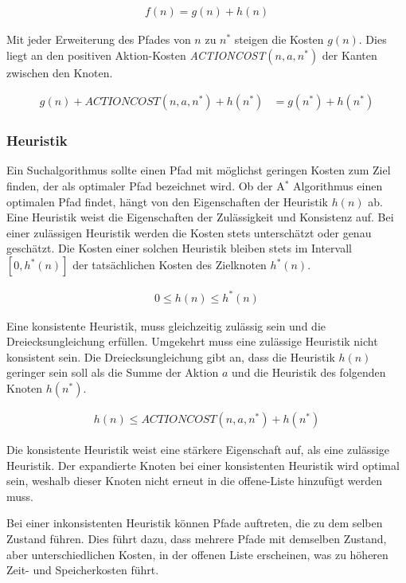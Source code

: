 \begin{align}
	f(n) = g(n) + h(n)
\end{align}


Mit jeder Erweiterung des Pfades von $n$ zu $n^{\ast}$ steigen die Kosten $g(n)$. Dies liegt an den positiven Aktion-Kosten \textit{ACTIONCOST}$(n,a,n^*)$ der Kanten zwischen den Knoten.


\begin{align}
	g(n) + \textit{ACTIONCOST}(n,a,n^*) + h(n^*) &= g(n^*) + h(n^*)
\end{align}

\subsubsection{Heuristik}

Ein Suchalgorithmus sollte einen Pfad mit m\"{o}glichst geringen Kosten zum Ziel finden, der als optimaler Pfad bezeichnet wird. Ob der A$^*$ Algorithmus einen optimalen Pfad findet, h\"{a}ngt von den Eigenschaften der Heuristik $h(n)$ ab. Eine Heuristik weist die Eigenschaften der Zul\"{a}ssigkeit und Konsistenz auf. Bei einer zul\"{a}ssigen Heuristik werden die Kosten stets untersch\"{a}tzt oder genau gesch\"{a}tzt. Die Kosten einer solchen Heuristik bleiben stets im Intervall $[0, h^{\ast}(n)]$ der tats\"{a}chlichen Kosten des Zielknoten $h^{\ast}(n)$.

\begin{align}
			0 \leq h(n) \leq h^*(n)
\end{align}

Eine konsistente Heuristik, muss gleichzeitig zul\"{a}ssig sein und die Dreiecksungleichung erf\"{u}llen. Umgekehrt muss eine zul\"{a}ssige Heuristik nicht konsistent sein. Die Dreiecksungleichung gibt an, dass die Heuristik $h(n)$ geringer sein soll als die Summe der Aktion $a$ und die Heuristik des folgenden Knoten $h(n^*)$.


\begin{align}
	h(n) \leq \textit{ACTIONCOST}(n,a,n^*) + h(n^*)
\end{align}

Die konsistente Heuristik weist eine st\"{a}rkere Eigenschaft auf, als eine zul\"{a}ssige Heuristik. Der expandierte Knoten bei einer konsistenten Heuristik wird optimal sein, weshalb dieser Knoten nicht erneut in die offene-Liste hinzuf\"{u}gt werden muss.

Bei einer inkonsistenten Heuristik k\"{o}nnen Pfade auftreten, die zu dem selben Zustand f\"{u}hren. Dies f\"{u}hrt dazu, dass mehrere Pfade mit demselben Zustand, aber unterschiedlichen Kosten, in der offenen Liste erscheinen, was zu h\"{o}heren Zeit- und Speicherkosten f\"{u}hrt.

